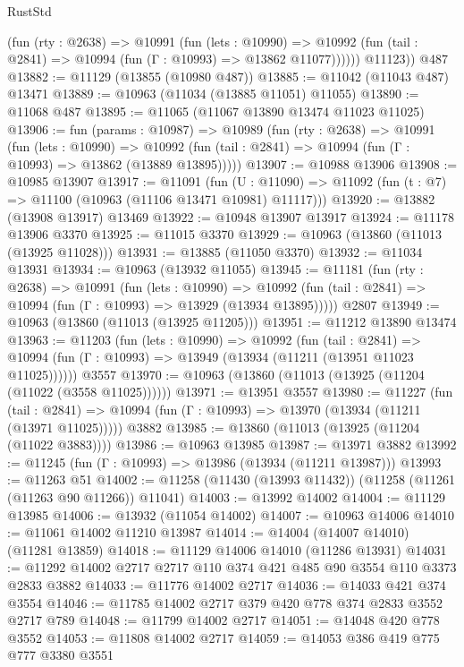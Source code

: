 \begin{lexlean}{RustStd}
\begin{coremodule}
            (fun (rty : @2638) =>
            @10991
              (fun (lets : @10990) =>
              @10992 (fun (tail : @2841) => @10994 (fun (Γ : @10993) => @13862 @11077))))))
        @11123))
    @487
@13882 := @11129 (@13855 (@10980 @487))
@13885 := @11042 (@11043 @487) @13471
@13889 := @10963 (@11034 (@13885 @11051) @11055)
@13890 := @11068 @487
@13895 := @11065 (@11067 @13890 @13474 @11023 @11025)
@13906 := fun (params : @10987) =>
  @10989
    (fun (rty : @2638) =>
    @10991
      (fun (lets : @10990) =>
      @10992 (fun (tail : @2841) => @10994 (fun (Γ : @10993) => @13862 (@13889 @13895)))))
@13907 := @10988 @13906
@13908 := @10985 @13907
@13917 := @11091
    (fun (U : @11090) => @11092 (fun (t : @7) => @11100 (@10963 (@11106 @13471 @10981) @11117)))
@13920 := @13882 (@13908 @13917) @13469
@13922 := @10948 @13907 @13917
@13924 := @11178 @13906 @3370
@13925 := @11015 @3370
@13929 := @10963 (@13860 (@11013 (@13925 @11028)))
@13931 := @13885 (@11050 @3370)
@13932 := @11034 @13931
@13934 := @10963 (@13932 @11055)
@13945 := @11181
    (fun (rty : @2638) =>
    @10991
      (fun (lets : @10990) =>
      @10992 (fun (tail : @2841) => @10994 (fun (Γ : @10993) => @13929 (@13934 @13895)))))
    @2807
@13949 := @10963 (@13860 (@11013 (@13925 @11205)))
@13951 := @11212 @13890 @13474
@13963 := @11203
    (fun (lets : @10990) =>
    @10992
      (fun (tail : @2841) =>
      @10994 (fun (Γ : @10993) => @13949 (@13934 (@11211 (@13951 @11023 @11025))))))
    @3557
@13970 := @10963 (@13860 (@11013 (@13925 (@11204 (@11022 (@3558 @11025))))))
@13971 := @13951 @3557
@13980 := @11227
    (fun (tail : @2841) => @10994 (fun (Γ : @10993) => @13970 (@13934 (@11211 (@13971 @11025)))))
    @3882
@13985 := @13860 (@11013 (@13925 (@11204 (@11022 @3883))))
@13986 := @10963 @13985
@13987 := @13971 @3882
@13992 := @11245 (fun (Γ : @10993) => @13986 (@13934 (@11211 @13987)))
@13993 := @11263 @51
@14002 := @11258 (@11430 (@13993 @11432)) (@11258 (@11261 (@11263 @90 @11266)) @11041)
@14003 := @13992 @14002
@14004 := @11129 @13985
@14006 := @13932 (@11054 @14002)
@14007 := @10963 @14006
@14010 := @11061 @14002 @11210 @13987
@14014 := @14004 (@14007 @14010) (@11281 @13859)
@14018 := @11129 @14006 @14010 (@11286 @13931)
@14031 := @11292 @14002 @2717 @2717 @110 @374 @421 @485 @90 @3554 @110 @3373 @2833 @3882
@14033 := @11776 @14002 @2717
@14036 := @14033 @421 @374 @3554
@14046 := @11785 @14002 @2717 @379 @420 @778 @374 @2833 @3552 @2717 @789
@14048 := @11799 @14002 @2717
@14051 := @14048 @420 @778 @3552
@14053 := @11808 @14002 @2717
@14059 := @14053 @386 @419 @775 @777 @3380 @3551

\end{coremodule}
\end{lexlean}
